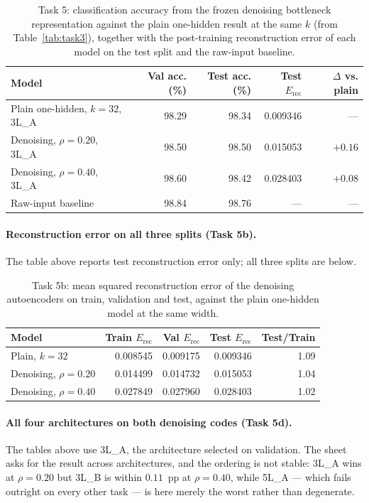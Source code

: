 \documentclass[11pt,a4paper]{article}
\begin{document}
\begin{table}[htbp]\centering
\caption{Task 5: classification accuracy from the frozen denoising bottleneck
representation against the plain one-hidden result at the same $k$ (from
Table~\ref{tab:task3}), together with the post-training reconstruction error of
each model on the test split and the raw-input baseline.}
\label{tab:task5clf}
\begin{tabular}{@{}lrrrr@{}}
\toprule Model & Val acc. (\%) & Test acc. (\%) & Test $E_{\mathrm{rec}}$ & $\Delta$ vs. plain \\
\midrule
Plain one-hidden, $k=32$, 3L\_A & 98.29 & 98.34 & 0.009346 & --- \\
Denoising, $\rho=0.20$, 3L\_A & 98.50 & 98.50 & 0.015053 & $+0.16$ \\
Denoising, $\rho=0.40$, 3L\_A & 98.60 & 98.42 & 0.028403 & $+0.08$ \\ \midrule
Raw-input baseline & 98.84 & 98.76 & --- & --- \\
\bottomrule
\end{tabular}
\end{table}

\paragraph{Reconstruction error on all three splits (Task 5b).}
The table above reports test reconstruction error only; all three splits are below.

\begin{table}[htbp]\centering
\caption{Task 5b: mean squared reconstruction error of the denoising autoencoders on train,
validation and test, against the plain one-hidden model at the same width.}\label{tab:task5rec}
\begin{tabular}{@{}lrrrr@{}}
\toprule Model & Train $E_{\mathrm{rec}}$ & Val $E_{\mathrm{rec}}$ & Test $E_{\mathrm{rec}}$ & Test/Train \\ \midrule
Plain, $k=32$          & 0.008545 & 0.009175 & 0.009346 & 1.09 \\
Denoising, $\rho=0.20$ & 0.014499 & 0.014732 & 0.015053 & 1.04 \\
Denoising, $\rho=0.40$ & 0.027849 & 0.027960 & 0.028403 & 1.02 \\
\bottomrule
\end{tabular}
\end{table}

\paragraph{All four architectures on both denoising codes (Task 5d).}
The tables above use 3L\_A, the architecture selected on validation. The sheet asks for the result
across architectures, and the ordering is not stable: 3L\_A wins at $\rho=0.20$ but 3L\_B is
within $0.11$~pp at $\rho=0.40$, while 5L\_A --- which fails outright on every other task --- is
here merely the worst rather than degenerate.
\end{document}
